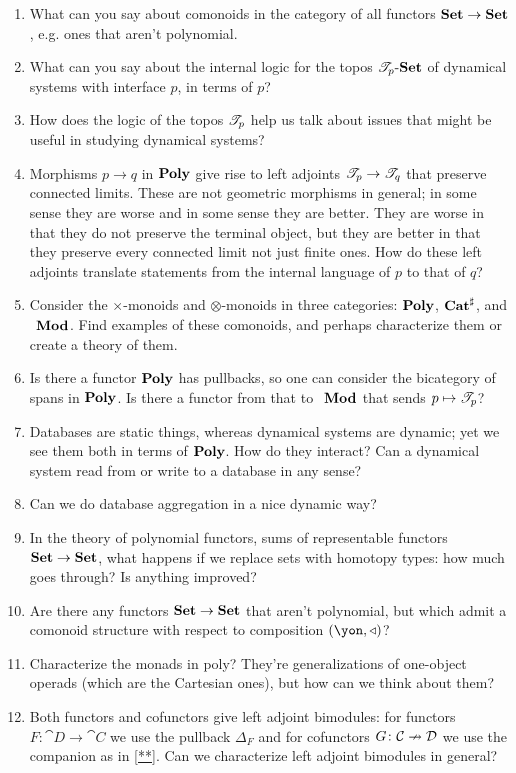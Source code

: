 \documentclass[DynamicalBook]{subfiles}
\begin{document}
\begin{enumerate}
  \item What can you say about comonoids in the category of all functors $\textbf{Set}\to\textbf{Set}$, e.g. ones that aren't polynomial.
  \item What can you say about the internal logic for the topos $\mathscr{T}_{p}\textnormal{-}\textbf{Set}$ of dynamical systems with interface $p$, in terms of $p$?
  \item How does the logic of the topos $\mathscr{T}_{p}$ help us talk about issues that might be useful in studying dynamical systems?
  \item Morphisms $p\to q$ in $\textbf{Poly}$ give rise to left adjoints $\mathscr{T}_{p}\to\mathscr{T}_{q}$ that preserve connected limits. These are not geometric morphisms in general; in some sense they are worse and in some sense they are better. They are worse in that they do not preserve the terminal object, but they are better in that they preserve every connected limit not just finite ones. How do these left adjoints translate statements from the internal language of $p$ to that of $q$?
  \item Consider the $\times$-monoids and $\otimes$-monoids in three categories: $\textbf{Poly}$, $\textbf{Cat}^\sharp$, and $~_{}\textbf{Mod}_{}$. Find examples of these comonoids, and perhaps characterize them or create a theory of them.
  \item Is there a functor $\textbf{Poly}$ has pullbacks, so one can consider the bicategory of spans in $\textbf{Poly}$. Is there a functor from that to $~_{}\textbf{Mod}_{}$ that sends $p\mapsto\mathscr{T}_{p}$?
  \item Databases are static things, whereas dynamical systems are dynamic; yet we see them both in terms of $\textbf{Poly}$. How do they interact? Can a dynamical system read from or write to a database in any sense?
  \item Can we do database aggregation in a nice dynamic way?
  \item In the theory of polynomial functors, sums of representable functors $\textbf{Set}\to\textbf{Set}$, what happens if we replace sets with homotopy types: how much goes through? Is anything improved?
  \item Are there any functors $\textbf{Set}\to\textbf{Set}$ that aren't polynomial, but which admit a comonoid structure with respect to composition $(\yon,\tri)$?
  \item Characterize the monads in poly? They're generalizations of one-object operads (which are the Cartesian ones), but how can we think about them?
  \item Both functors and cofunctors give left adjoint bimodules: for functors $F\colon\cat{D}\to\cat{C}$ we use the pullback $\Delta_F$ and for cofunctors $G\colon\mathcal{C}\nrightarrow\mathcal{D}$ we use the companion as in \cref{**}. Can we characterize left adjoint bimodules in general?

\end{enumerate}
\end{document}
